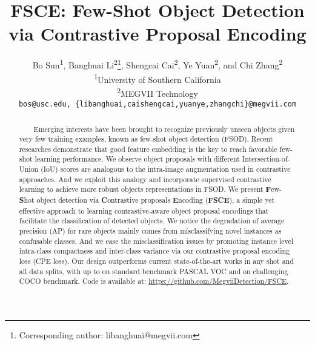 \documentclass[final]{cvpr}
\newcommand*{\affaddr}[1]{#1} \newcommand*{\affmark}[1][*]{\textsuperscript{#1}}
\newcommand*{\email}[1]{\texttt{#1}}
\begin{document}
\title{FSCE: Few-Shot Object Detection via Contrastive Proposal Encoding}

\author{Bo Sun\affmark[1], Banghuai Li\affmark[2]\thanks{Corresponding author: libanghuai@megvii.com}, Shengcai Cai\affmark[2], Ye Yuan\affmark[2], and Chi Zhang\affmark[2]\\
\affaddr{\affmark[1]University of Southern California}\\
\affaddr{\affmark[2]MEGVII Technology}\\
\email{bos@usc.edu, \{libanghuai,caishengcai,yuanye,zhangchi\}@megvii.com}\\
}

\maketitle

\begin{abstract}
\vspace{-2.5mm}
\ \ \ \ Emerging interests have been brought to recognize previously unseen objects given very few training examples, known as few-shot object detection (FSOD). Recent researches demonstrate that good feature embedding is the key to reach favorable few-shot learning performance.  We observe object proposals with different Intersection-of-Union (IoU) scores are analogous to the intra-image augmentation used in contrastive approaches. And we exploit this analogy and incorporate supervised contrastive learning to achieve more robust objects representations in FSOD. We present \textbf{F}ew-\textbf{S}hot object detection via \textbf{C}ontrastive proposals \textbf{E}ncoding (\textbf{FSCE}), a simple yet effective approach to learning contrastive-aware object proposal encodings that facilitate the classification of detected objects. We notice the degradation of average precision (AP) for rare objects mainly comes from misclassifying novel instances as confusable classes. And we ease the misclassification issues by promoting instance level intra-class compactness and inter-class variance via our contrastive proposal encoding loss (CPE loss). Our design outperforms current state-of-the-art works in any shot and all data splits, with up to  on standard benchmark PASCAL VOC and  on challenging COCO benchmark. Code is available at: \url{https://github.com/MegviiDetection/FSCE}.
\end{abstract}
\end{document}
